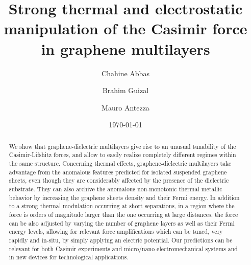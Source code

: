 \documentclass[aps,pra,superscriptaddress,amsmath,amssymb,showpacs,twocolumn,notitlepage]{revtex4-1}
\begin{document}
\title{Strong thermal and electrostatic manipulation of the Casimir force \\ in graphene multilayers}
\author{Chahine Abbas}
\author{Brahim Guizal}
\author{Mauro Antezza}
\date{\today}
%
%
\begin{abstract}


{We show that graphene-dielectric multilayers give rise to an  unusual tunability of the Casimir-Lifshitz forces, and allow to easily realize completely different regimes within the same structure. Concerning thermal effects, graphene-dielectric multilayers take advantage from the anomalous features predicted for isolated suspended graphene sheets, even though they are considerably affected  by the presence of the dielectric substrate. They can also archive the anomalous non-monotonic thermal metallic behavior by increasing the graphene sheets density and their Fermi energy. In addition to a strong thermal modulation occurring at short separations, in a region where the force is orders of magnitude larger than the one occurring at large distances, the force can be also adjusted by varying the number of graphene layers as well as their Fermi energy levels, allowing for relevant force amplifications which can be tuned, very rapidly and in-situ, by simply applying an electric potential. Our predictions can be relevant for both Casimir experiments and micro/nano electromechanical systems and in new devices for technological applications.}

\end{abstract}

\maketitle
%
\end{document}
